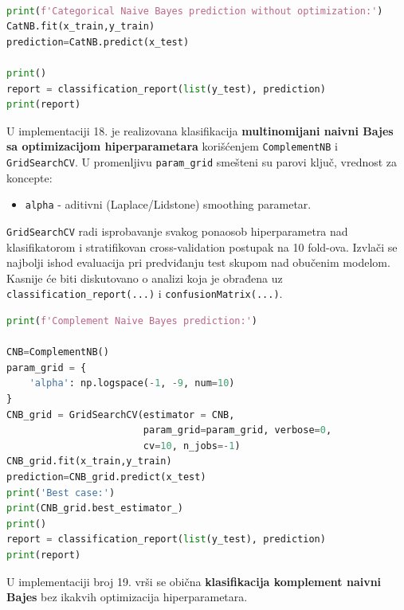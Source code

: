 \documentclass[fontsize=12bp, paper=a4]{scrarticle}
\begin{document}
\begin{lstlisting}[language=Python, caption=Kategorički naivni Bajes bez ikakvih optimizacija hiperparametara.]

print(f'Categorical Naive Bayes prediction without optimization:')
CatNB.fit(x_train,y_train)
prediction=CatNB.predict(x_test)

print()
report = classification_report(list(y_test), prediction)
print(report)
\end{lstlisting}
U implementaciji 18. je realizovana klasifikacija \textbf{multinomijani naivni Bajes sa optimizacijom hiperparametara} korišćenjem \verb|ComplementNB|\cite{CNB} i \verb|GridSearchCV|. U promenljivu \verb|param_grid| smešteni su parovi ključ, vrednost za koncepte:
\begin{itemize}
    \item \verb|alpha| - aditivni (Laplace/Lidstone) smoothing parametar.
\end{itemize} 
\verb*|GridSearchCV| radi isprobavanje svakog ponaosob hiperparametra nad klasifikatorom i stratifikovan cross-validation postupak na 10 fold-ova. Izvlači se najbolji ishod evaluacija pri predviđanju test skupom nad obučenim modelom. Kasnije će biti diskutovano o analizi koja je obrađena uz \verb|classification_report(...)| i \verb|confusionMatrix(...)|.
\begin{lstlisting}[language=Python, caption=Komplementarni naivni Bajes sa optimizacijama hiperparametara.]
print(f'Complement Naive Bayes prediction:')

CNB=ComplementNB()
param_grid = {
    'alpha': np.logspace(-1, -9, num=10)
}
CNB_grid = GridSearchCV(estimator = CNB,
						param_grid=param_grid, verbose=0, 									
                        cv=10, n_jobs=-1)
CNB_grid.fit(x_train,y_train)
prediction=CNB_grid.predict(x_test)
print('Best case:')
print(CNB_grid.best_estimator_)
print()
report = classification_report(list(y_test), prediction)
print(report)
\end{lstlisting}
U implementaciji broj 19. vrši se obična \textbf{klasifikacija komplement naivni Bajes } bez ikakvih optimizacija hiperparametara.
\end{document}
